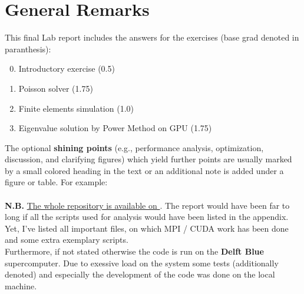 \section*{General Remarks}
This final Lab report includes the answers for the exercises (base grad denoted in paranthesis):
\begin{enumerate}
    \setcounter{enumi}{-1}
    \item Introductory exercise (0.5)
    \item Poisson solver (1.75)
    \item Finite elements simulation (1.0)
    \item Eigenvalue solution by Power Method on GPU (1.75)
\end{enumerate}
The optional \textbf{shining points} (e.g., performance analysis, optimization, discussion, and
clarifying figures) which yield further points are usually marked by a small colored heading in the text or an additional note is added under a figure or table. For example:\\
 \\

\textbf{N.B.} \underline{The whole repository is available on }. The report would have been far to long if all the scripts used for analysis would have been listed in the appendix. Yet, I've listed all important files, on which MPI / CUDA work has been done and some extra exemplary scripts.\\

Furthermore, if not stated otherwise the code is run on the \textbf{Delft Blue} supercomputer. Due to exessive load on the system some tests (additionally denoted) and especially the development of the code was done on the local machine. 